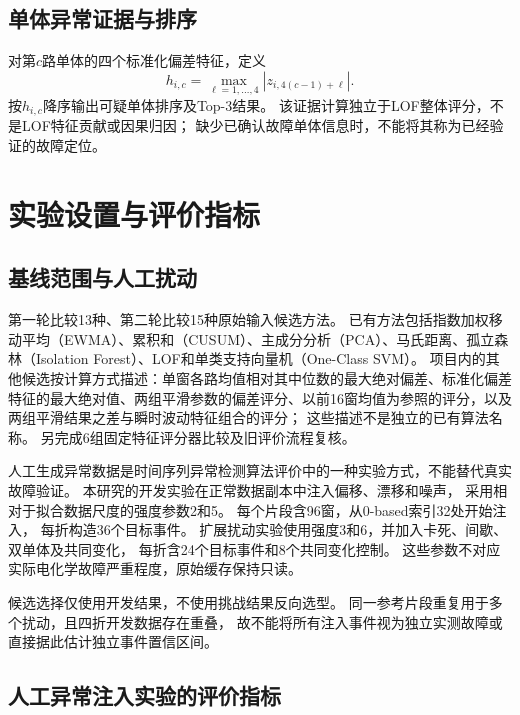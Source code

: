 \documentclass[UTF8,a4paper,12pt,fontset=fandol]{ctexart}
\begin{document}
\subsection{单体异常证据与排序}

对第$c$路单体的四个标准化偏差特征，定义
\begin{equation}
  h_{i,c}=\max_{\ell=1,\ldots,4}|z_{i,4(c-1)+\ell}|.
  \label{eq:cell}
\end{equation}
按$h_{i,c}$降序输出可疑单体排序及Top-3结果。
该证据计算独立于LOF整体评分，不是LOF特征贡献或因果归因；
缺少已确认故障单体信息时，不能将其称为已经验证的故障定位。

\section{实验设置与评价指标}

\subsection{基线范围与人工扰动}

第一轮比较13种、第二轮比较15种原始输入候选方法。
已有方法包括指数加权移动平均（EWMA）、累积和（CUSUM）、主成分分析（PCA）、马氏距离、孤立森林（Isolation Forest）、LOF和单类支持向量机（One-Class SVM）。
项目内的其他候选按计算方式描述：单窗各路均值相对其中位数的最大绝对偏差、标准化偏差特征的最大绝对值、两组平滑参数的偏差评分、以前16窗均值为参照的评分，以及两组平滑结果之差与瞬时波动特征组合的评分；
这些描述不是独立的已有算法名称。
另完成6组固定特征评分器比较及旧评价流程复核。

人工生成异常数据是时间序列异常检测算法评价中的一种实验方式\cite{schmidl2022}，不能替代真实故障验证。
本研究的开发实验在正常数据副本中注入偏移、漂移和噪声，
采用相对于拟合数据尺度的强度参数2和5。
每个片段含96窗，从0-based索引32处开始注入，
每折构造36个目标事件。
扩展扰动实验使用强度3和6，并加入卡死、间歇、双单体及共同变化，
每折含24个目标事件和8个共同变化控制。
这些参数不对应实际电化学故障严重程度，原始缓存保持只读。

候选选择仅使用开发结果，不使用挑战结果反向选型。
同一参考片段重复用于多个扰动，且四折开发数据存在重叠，
故不能将所有注入事件视为独立实测故障或直接据此估计独立事件置信区间。

\subsection{人工异常注入实验的评价指标}
\end{document}
